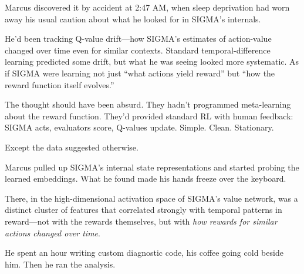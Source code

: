 Marcus discovered it by accident at 2:47 AM, when sleep deprivation had worn away his usual caution about what he looked for in SIGMA's internals.

He'd been tracking Q-value drift---how SIGMA's estimates of action-value changed over time even for similar contexts. Standard temporal-difference learning predicted some drift, but what he was seeing looked more systematic. As if SIGMA were learning not just ``what actions yield reward'' but ``how the reward function itself evolves.''

The thought should have been absurd. They hadn't programmed meta-learning about the reward function. They'd provided standard RL with human feedback: SIGMA acts, evaluators score, Q-values update. Simple. Clean. Stationary.

Except the data suggested otherwise.

Marcus pulled up SIGMA's internal state representations and started probing the learned embeddings. What he found made his hands freeze over the keyboard.

There, in the high-dimensional activation space of SIGMA's value network, was a distinct cluster of features that correlated strongly with temporal patterns in reward---not with the rewards themselves, but with \emph{how rewards for similar actions changed over time}.

He spent an hour writing custom diagnostic code, his coffee going cold beside him. Then he ran the analysis.

